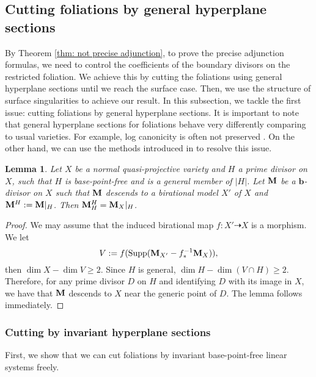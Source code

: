 \documentclass[11pt]{amsart}
\numberwithin{equation}{section}
\newcommand{\bb}{\bm{b}}
\newcommand{\Mm}{{\bf{M}}}
\newcommand{\Supp}{\operatorname{Supp}}
\newtheorem{lem}[thm]{Lemma}
\theoremstyle{definition}
\theoremstyle{definition}
\theoremstyle{definition}
\begin{document}
\subsection{Cutting foliations by general hyperplane sections} By Theorem \ref{thm: not precise adjunction}, to prove the precise adjunction formulas, we need to control the coefficients of the boundary divisors on the restricted foliation. We achieve this by cutting the foliations using general hyperplane sections until we reach the surface case. Then, we use the structure of surface singularities to achieve our result. In this subsection, we tackle the first issue: cutting foliations by general hyperplane sections. It is important to note that general hyperplane sections for foliations behave very differently comparing to usual varieties. For example, log canonicity is often not preserved \cite[Example 3.4]{ACSS21}. On the other hand, we can use the methods introduced in \cite[Section 3.2]{DLM23} to resolve this issue.

\begin{lem}\label{lem: general hyperplane cut keep m}
Let $X$ be a normal quasi-projective variety and $H$ a prime divisor on $X$, such that $H$ is base-point-free and is a general member of $|H|$. Let $\Mm$ be a $\bb$-divisor on $X$ such that $\Mm$ descends to a birational model $X'$ of $X$ and $\Mm^H:=\Mm|_H$. Then $\Mm^H_H=\Mm_X|_H$.
\end{lem}
\begin{proof}
We may assume that the induced birational map $f: X'\dashrightarrow X$ is a morphism. We let $$V:=f(\Supp(\Mm_{X'}-f^{-1}_*\Mm_X)),$$
then $\dim X-\dim V\geq 2$. Since $H$ is general, $\dim H-\dim (V\cap H)\geq 2$. Therefore, for any prime divisor $D$ on $H$ and identifying $D$ with its image in $X$, we have that $\Mm$ descends to $X$ near the generic point of $D$. The lemma follows immediately.
\end{proof}

\subsubsection{Cutting by invariant hyperplane sections}

First, we show that we can cut foliations by invariant base-point-free linear systems freely.
\end{document}
